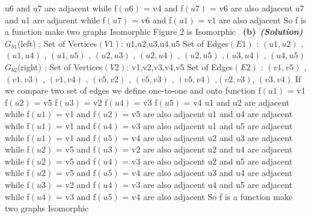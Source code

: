 \documentclass[a4 paper]{article}
\newcommand{\subproblem}[1]{~\newline\textbf{(#1)}}
\newcommand{\solutionx}{~\textbf{\textit{(Solution)}} }
\newcommand{\0}{\mathbf{0}}
\begin{document}
u6 and u7 are adjacent  while f$(u6)$ = v4 and f$(u7)$ = v6 are also adjacent\newline
u7 and u1 are adjacent  while f$(u7)$ = v6 and f$(u1)$ = v1 are also adjacent\newline
So f is a function make two graphs Isomorphic\newline
Figure 2 is Isomorphic\newline
\subproblem{b}\solutionx\\
$G_{b1}$(left) ; \newline
Set of Vertices$(V1)$: {u1,u2,u3,u4,u5} \newline
Set of Edges$(E1)$ : {$(u1,u2)$ , $(u1,u4)$ , $(u1,u5)$ , $(u2,u3)$ , $(u2,u4)$ , $(u2,u5)$ ,$(u3,u4)$ , $(u4,u5)$} \newline
$G_{b2}$(right) ; \newline
Set of Vertices$(V2)$: {v1,v2,v3,v4,v5} \newline
Set of Edges$(E2)$ : {$(v1,v5)$ , $(v1,v3)$ , $(v1,v4)$ , $(v5,v2)$ , $(v5,v3)$ , $(v5,v4)$ ,$(v2,v3)$, $(v3,v4)$} \newline
If we compare two set of edges we define one-to-one and onto function\newline
f$(u1)$ = v1 \newline
f$(u2)$ = v5 \newline
f$(u3)$ = v2 \newline
f$(u4)$ = v3 \newline
f$(u5)$ = v4 \newline
u1 and u2 are adjacent  while f$(u1)$ = v1 and f$(u2)$ = v5 are also adjacent\newline
u1 and u4 are adjacent  while f$(u1)$ = v1 and f$(u4)$ = v3 are also adjacent\newline
u1 and u5 are adjacent  while f$(u1)$ = v1 and f$(u5)$ = v4 are also adjacent\newline
u2 and u3 are adjacent  while f$(u2)$ = v5 and f$(u3)$ = v2 are also adjacent\newline
u2 and u4 are adjacent  while f$(u2)$ = v5 and f$(u4)$ = v3 are also adjacent\newline
u2 and u5 are adjacent  while f$(u2)$ = v5 and f$(u5)$ = v4 are also adjacent\newline
u3 and u4 are adjacent  while f$(u3)$ = v2 and f$(u4)$ = v3 are also adjacent\newline
u4 and u5 are adjacent  while f$(u4)$ = v3 and f$(u5)$ = v4 are also adjacent\newline
So f is a function make two graphs Isomorphic\newline
\end{document}
